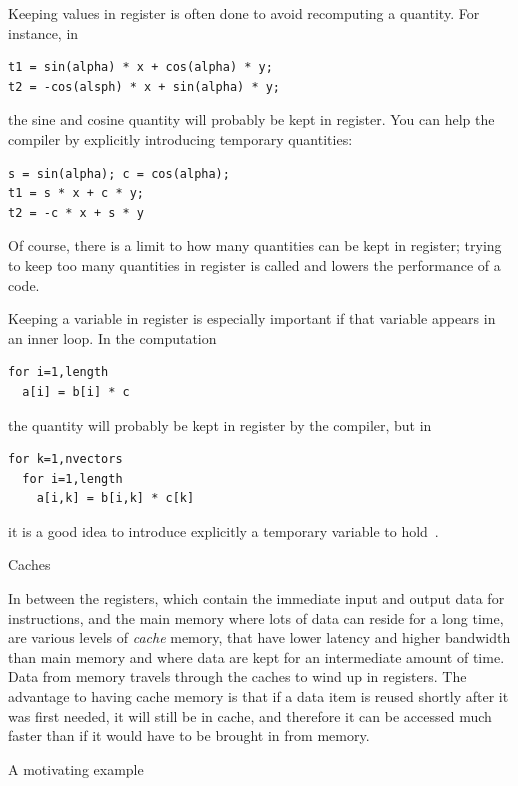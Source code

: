 Keeping values in register is often done to avoid recomputing a
quantity. For instance, in 
\begin{verbatim}
t1 = sin(alpha) * x + cos(alpha) * y;
t2 = -cos(alsph) * x + sin(alpha) * y;
\end{verbatim}
the sine and cosine quantity will probably be kept in register. You
can help the compiler by explicitly introducing temporary quantities:
\begin{verbatim}
s = sin(alpha); c = cos(alpha);
t1 = s * x + c * y;
t2 = -c * x + s * y
\end{verbatim}
Of
course, there is a limit to how many quantities can be kept in
register; trying to keep too many quantities in register is called
 and lowers the performance of a code.

Keeping a variable in register is especially important if that
variable appears in an inner loop. In the computation
\begin{verbatim}
for i=1,length
  a[i] = b[i] * c
\end{verbatim}
the quantity  will probably be kept in register by the compiler,
but in 
\begin{verbatim}
for k=1,nvectors
  for i=1,length
    a[i,k] = b[i,k] * c[k]
\end{verbatim}
it is a good idea to introduce explicitly a temporary variable to
hold~.


 {Caches}

In between the registers, which contain the immediate input and output
data for instructions, and the main memory where lots of data can reside for a
long time, are various levels of \emph{cache} memory, that have
lower latency and higher bandwidth than main memory and where data are
kept for an intermediate amount of time.  Data from
memory travels through the caches to wind up in registers. The
advantage to having cache memory is that if a data item is reused
shortly after it was first needed, it will still be in cache, and
therefore it can be accessed much faster than if it would have to be
brought in from memory.

 {A motivating example}

